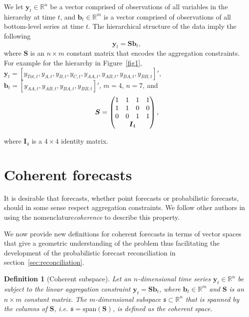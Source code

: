 \documentclass[a4paper, 11pt]{article}
\newtheorem{definition}{Definition}[section]
\begin{document}
We let $\bm{y}_t \in \mathbb{R}^n$ be a vector comprised of observations of all variables in the hierarchy at time $t$,  and $\bm{b}_t \in \mathbb{R}^m$ is a vector comprised of observations of all bottom-level series at time $t$. The hierarchical structure of the data imply the following
\begin{equation}
  \bm{y}_t = \bm{Sb}_t,
\end{equation}
where $\bm{S}$ is an $n \times m$ constant matrix that encodes the aggregation constraints.  For example for the hierarchy in Figure~\ref{fig1}, $\bm{y}_t = [y_{Tot,t},y_{A,t}, y_{B,t},y_{C,t},y_{AA,t}, y_{AB,t}, y_{BA,t}, y_{BB,t}]'$, $\bm{b}_t = [y_{AA,t}, y_{AB,t}, y_{BA,t}, y_{BB,t}]'$, $m=4$, $n=7$, and 
$$ 
  \bm{S} = \begin{pmatrix} 
               1& 1 &1 &1  \\ 
               1 &1 & 0 &0 \\   
               0&0  & 1 & 1 \\ 
               & \multicolumn{2}{c}{\bm{I}_4} &   
           \end{pmatrix}, 
$$ 

where $\bm{I}_4$ is a $4\times 4$ identity matrix.  

\section{Coherent forecasts}\label{sec:definitions}

It is desirable that forecasts, whether point forecasts or probabilistic forecasts, should in some sense respect aggregation constraints.  We follow other authors in using the nomenclature{\em coherence} to describe this property.   

We now provide new definitions for coherent forecasts in terms of vector spaces that give a geometric understanding of the problem thus facilitating the development of the probabilistic forecast reconciliation in section~\ref{sec:reconciliation}. 

\begin{definition}[Coherent subspace]\label{def:cohspace}
Let an $n$-dimensional time series $\bm{y}_t \in \mathbb{R}^n$ be subject to the linear aggregation constraint $\bm{y}_t = \bm{S}\bm{b}_t$, where $\bm{b}_t \in \mathbb{R}^m$ and $\bm{S}$ is an $n \times m$ constant matrix. The $m$-dimensional subspace $\mathfrak{s}\subset \mathbb{R}^n$ that is spanned by the columns of $\bm{S}$, i.e. $\mathfrak{s}=\mbox{span}(\bm{S})$, is defined as the {\em coherent space}. 
\end{definition}
\end{document}
